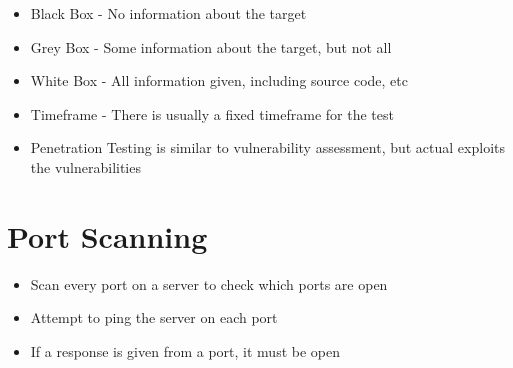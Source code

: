 \begin{itemize}
  \item Black Box - No information about the target
  \item Grey Box - Some information about the target, but not all
  \item White Box - All information given, including source code, etc
  \item Timeframe - There is usually a fixed timeframe for the test
  \item Penetration Testing is similar to vulnerability assessment, but actual exploits the vulnerabilities
\end{itemize}

\section*{Port Scanning}

\begin{itemize}
  \item Scan every port on a server to check which ports are open
  \item Attempt to ping the server on each port
  \item If a response is given from a port, it must be open
\end{itemize}